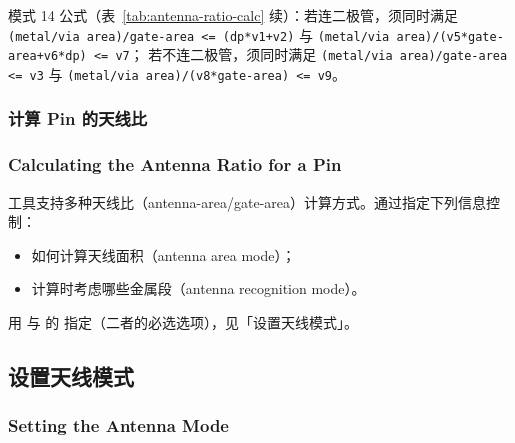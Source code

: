模式 14 公式（表~\ref{tab:antenna-ratio-calc} 续）：若连二极管，须同时满足
\texttt{(metal/via area)/gate-area <= (dp*v1+v2)} 与
\texttt{(metal/via area)/(v5*gate-area+v6*dp) <= v7}；
若不连二极管，须同时满足
\texttt{(metal/via area)/gate-area <= v3} 与
\texttt{(metal/via area)/(v8*gate-area) <= v9}。

\subsubsection{计算 Pin 的天线比}
\subsubsection*{Calculating the Antenna Ratio for a Pin}

工具支持多种天线比（antenna-area/gate-area）计算方式。通过指定下列信息控制：
\begin{itemize}
  \item 如何计算天线面积（antenna area mode）；
  \item 计算时考虑哪些金属段（antenna recognition mode）。
\end{itemize}
用  与  的  指定（二者的必选选项），见「设置天线模式」。

\subsection{设置天线模式}
\subsubsection*{Setting the Antenna Mode}

